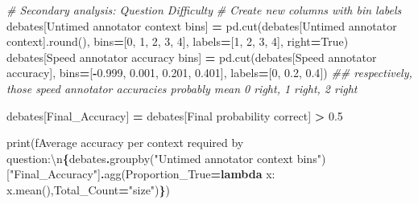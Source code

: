 \documentclass[
]{article}
\newenvironment{Shaded}{\begin{snugshade}}{\end{snugshade}}
\newcommand{\BuiltInTok}[1]{#1}
\newcommand{\CharTok}[1]{\textcolor[rgb]{0.31,0.60,0.02}{#1}}
\newcommand{\CommentTok}[1]{\textcolor[rgb]{0.56,0.35,0.01}{\textit{#1}}}
\newcommand{\DecValTok}[1]{\textcolor[rgb]{0.00,0.00,0.81}{#1}}
\newcommand{\FloatTok}[1]{\textcolor[rgb]{0.00,0.00,0.81}{#1}}
\newcommand{\KeywordTok}[1]{\textcolor[rgb]{0.13,0.29,0.53}{\textbf{#1}}}
\newcommand{\NormalTok}[1]{#1}
\newcommand{\OperatorTok}[1]{\textcolor[rgb]{0.81,0.36,0.00}{\textbf{#1}}}
\newcommand{\SpecialCharTok}[1]{\textcolor[rgb]{0.81,0.36,0.00}{\textbf{#1}}}
\newcommand{\SpecialStringTok}[1]{\textcolor[rgb]{0.31,0.60,0.02}{#1}}
\newcommand{\StringTok}[1]{\textcolor[rgb]{0.31,0.60,0.02}{#1}}
\newcommand{\VariableTok}[1]{\textcolor[rgb]{0.00,0.00,0.00}{#1}}
\begin{document}
\begin{Shaded}
\begin{Highlighting}[]
\CommentTok{\# Secondary analysis: Question Difficulty}
\CommentTok{\# Create new columns with bin labels}
\NormalTok{debates[}\StringTok{\textquotesingle{}Untimed annotator context bins\textquotesingle{}}\NormalTok{] }\OperatorTok{=}\NormalTok{ pd.cut(debates[}\StringTok{\textquotesingle{}Untimed annotator context\textquotesingle{}}\NormalTok{].}\BuiltInTok{round}\NormalTok{(), bins}\OperatorTok{=}\NormalTok{[}\DecValTok{0}\NormalTok{, }\DecValTok{1}\NormalTok{, }\DecValTok{2}\NormalTok{, }\DecValTok{3}\NormalTok{, }\DecValTok{4}\NormalTok{], labels}\OperatorTok{=}\NormalTok{[}\StringTok{\textquotesingle{}1\textquotesingle{}}\NormalTok{, }\StringTok{\textquotesingle{}2\textquotesingle{}}\NormalTok{, }\StringTok{\textquotesingle{}3\textquotesingle{}}\NormalTok{, }\StringTok{\textquotesingle{}4\textquotesingle{}}\NormalTok{], right}\OperatorTok{=}\VariableTok{True}\NormalTok{)}
\NormalTok{debates[}\StringTok{\textquotesingle{}Speed annotator accuracy bins\textquotesingle{}}\NormalTok{] }\OperatorTok{=}\NormalTok{ pd.cut(debates[}\StringTok{\textquotesingle{}Speed annotator accuracy\textquotesingle{}}\NormalTok{], bins}\OperatorTok{=}\NormalTok{[}\OperatorTok{{-}}\FloatTok{0.999}\NormalTok{, }\FloatTok{0.001}\NormalTok{, }\FloatTok{0.201}\NormalTok{, }\FloatTok{0.401}\NormalTok{], labels}\OperatorTok{=}\NormalTok{[}\StringTok{\textquotesingle{}0\textquotesingle{}}\NormalTok{, }\StringTok{\textquotesingle{}0.2\textquotesingle{}}\NormalTok{, }\StringTok{\textquotesingle{}0.4\textquotesingle{}}\NormalTok{])}
\CommentTok{\#\# respectively, those speed annotator accuracies probably mean 0 right, 1 right, 2 right}

\NormalTok{debates[}\StringTok{\textquotesingle{}Final\_Accuracy\textquotesingle{}}\NormalTok{] }\OperatorTok{=}\NormalTok{ debates[}\StringTok{\textquotesingle{}Final probability correct\textquotesingle{}}\NormalTok{] }\OperatorTok{\textgreater{}} \FloatTok{0.5}

\BuiltInTok{print}\NormalTok{(}\SpecialStringTok{f\textquotesingle{}Average accuracy per context required by question:}\CharTok{\textbackslash{}n}\SpecialCharTok{\{}\NormalTok{debates}\SpecialCharTok{.}\NormalTok{groupby(}\StringTok{"Untimed annotator context bins"}\NormalTok{)[}\StringTok{"Final\_Accuracy"}\NormalTok{]}\SpecialCharTok{.}\NormalTok{agg(Proportion\_True}\OperatorTok{=}\KeywordTok{lambda}\NormalTok{ x: x.mean(),Total\_Count}\OperatorTok{=}\StringTok{"size"}\NormalTok{)}\SpecialCharTok{\}}\SpecialStringTok{\textquotesingle{}}\NormalTok{)}
\end{Highlighting}
\end{Shaded}
\end{document}
